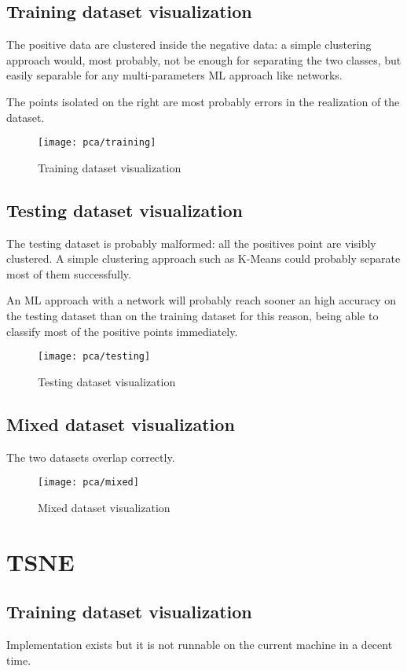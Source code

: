 \subsection{Training dataset visualization}
The positive data are clustered inside the negative data: a simple clustering approach would, most probably, not be enough for separating the two classes, but easily separable for any multi-parameters ML approach like networks.

The points isolated on the right are most probably errors in the realization of the dataset.

\begin{figure}
	\texttt{[image: pca/training]}
	\caption{Training dataset visualization}
\end{figure}

\subsection{Testing dataset visualization}
The testing dataset is probably malformed: all the positives point are visibly clustered. A simple clustering approach such as K-Means could probably separate most of them successfully.

An ML approach with a network will probably reach sooner an high accuracy on the testing dataset than on the training dataset for this reason, being able to classify most of the positive points immediately.

\begin{figure}
	\texttt{[image: pca/testing]}
	\caption{Testing dataset visualization}
\end{figure}

\subsection{Mixed dataset visualization}
The two datasets overlap correctly.
\begin{figure}
	\texttt{[image: pca/mixed]}
	\caption{Mixed dataset visualization}
\end{figure}

\section{TSNE}

\subsection{Training dataset visualization}
Implementation exists but it is not runnable on the current machine in a decent time.


